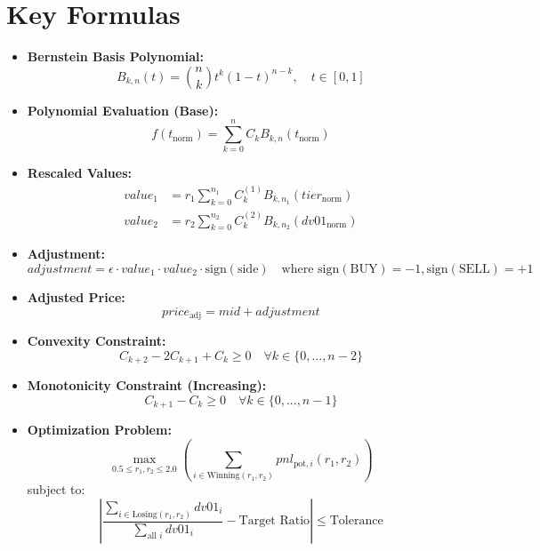 \documentclass[11pt, a4paper]{article}
\begin{document}
\section*{Key Formulas}
\begin{itemize}
    \item \textbf{Bernstein Basis Polynomial:}
    \begin{equation*}
        B_{k,n}(t) = \binom{n}{k} t^k (1-t)^{n-k}, \quad t \in [0, 1]
    \end{equation*}
    \item \textbf{Polynomial Evaluation (Base):}
    \begin{equation*}
        f(t_{\text{norm}}) = \sum_{k=0}^{n} C_k B_{k,n}(t_{\text{norm}})
    \end{equation*}
    \item \textbf{Rescaled Values:}
    \begin{align*} %
        value_1 &= r_1 \sum_{k=0}^{n_1} C^{(1)}_k B_{k,n_1}(tier_{\text{norm}}) \\
        value_2 &= r_2 \sum_{k=0}^{n_2} C^{(2)}_k B_{k,n_2}(dv01_{\text{norm}})
    \end{align*}
    \item \textbf{Adjustment:}
    \begin{equation*}
        adjustment = \epsilon \cdot value_1 \cdot value_2 \cdot \text{sign}(\text{side})
        \quad \text{where sign}(\text{BUY}) = -1, \text{sign}(\text{SELL}) = +1
    \end{equation*}
    \item \textbf{Adjusted Price:}
    \begin{equation*}
        price_{\text{adj}} = mid + adjustment
    \end{equation*}
    \item \textbf{Convexity Constraint:}
    \begin{equation*}
        C_{k+2} - 2C_{k+1} + C_k \ge 0 \quad \forall k \in \{0, ..., n-2\}
    \end{equation*}
    \item \textbf{Monotonicity Constraint (Increasing):}
    \begin{equation*}
        C_{k+1} - C_k \ge 0 \quad \forall k \in \{0, ..., n-1\}
    \end{equation*}
    \item \textbf{Optimization Problem:}
    \begin{equation*}
        \max_{0.5 \le r_1, r_2 \le 2.0} \left( \sum_{i \in \text{Winning}(r_1, r_2)} pnl_{\text{pot},i}(r_1, r_2) \right)
    \end{equation*}
    subject to:
    \begin{equation*}
        \left| \frac{\sum_{i \in \text{Losing}(r_1, r_2)} dv01_i}{\sum_{\text{all } i} dv01_i} - \text{Target Ratio} \right| \le \text{Tolerance}
    \end{equation*}
\end{itemize}
\end{document}
